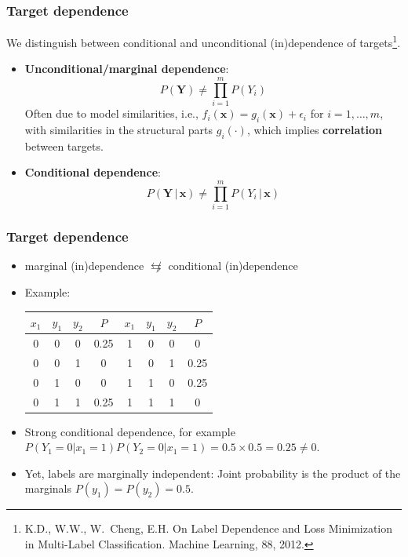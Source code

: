 \documentclass[]{beamer}
\renewcommand{\Pr}{P}
\newcommand{\given}{\, | \,}
\newcommand{\bx}{\boldsymbol{x}}
\newcommand{\bY}{\boldsymbol{Y}}
\renewcommand{\emph}[1]{\textbf{\color{putblue}#1}}
\begin{document}
\begin{frame}
\frametitle{Target dependence}
We distinguish between conditional and unconditional (in)dependence of targets\footnote{K.D., W.W., W.\ Cheng, E.H. On Label Dependence and Loss Minimization in Multi-Label Classification. Machine Learning, 88, 2012.}.
\begin{itemize}
\item \emph{Unconditional/marginal dependence}: 
$$
\Pr(\bY) \ne \prod_{i=1}^m \Pr(Y_i) 
$$
Often due to model similarities, i.e., $f_i(\bx) = g_i(\bx) + \epsilon_i$ for $i = 1, \ldots, m$, with similarities in the structural parts $g_i(\cdot)$, which implies \emph{correlation} between targets. 
\pause

\item \emph{Conditional dependence}:
$$
\Pr(\bY \given \bx) \ne \prod_{i=1}^m \Pr(Y_i \given \bx)
$$

\end{itemize}
\end{frame}

\begin{frame}
\frametitle{Target dependence}
\begin{itemize}
\item
marginal (in)dependence $\not \leftrightarrows$ conditional (in)dependence

\item Example: 
\begin{center}
\begin{tabular}{cccc@{$\qquad$}cccc}
\toprule
$x_1$ & $y_1$ & $y_2$ & $\Pr$ & $x_1$ & $y_1$ & $y_2$ & $\Pr$ \\
\midrule
0   & 0   & 0   & 0.25  & 1   & 0   & 0   & 0       \\
0   & 0   & 1   & 0     & 1   & 0   & 1   & 0.25  \\
0   & 1   & 0   & 0     & 1   & 1   & 0   & 0.25 \\
0   & 1   & 1   & 0.25   & 1   & 1   & 1   & 0 \\
\bottomrule
\end{tabular}
\end{center}

\medskip 

\item Strong conditional dependence, for example
$\Pr(Y_1 = 0 | x_1 = 1) \Pr(Y_2 = 0 | x_1 = 1) = 0.5 \times 0.5 = 0.25 \neq 0$.
\item Yet, labels are marginally independent: Joint probability is the product of the marginals $\Pr(y_1) = \Pr(y_2) = 0.5$.
\end{itemize}
\end{frame}
\end{document}

